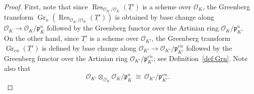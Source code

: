 \documentclass[11pt]{amsart}
\theoremstyle{plain}
\theoremstyle{definition}
\theoremstyle{remark}
\newcommand{\OK}{\mathcal{O}_K}
\newcommand{\pK}{\mathfrak{p}_K}
\DeclareMathOperator{\Gr}{Gr}
\DeclareMathOperator{\Res}{Res}
\newcommand{\iso}{{\ \cong\ }}
\begin{document}
\begin{proof}
First, note that since $\Res_{\mathcal{O}_{K'}/\OK}(\underline{T'})$ 
is a scheme over $\OK$, 
the Greenberg transform $\Gr_{n}\left( \Res_{\mathcal{O}_{K'}/\OK}(\underline{T'})\right)$ 
is obtained by base change along $\OK \to \OK/\pK^n$ 
followed by the Greenberg functor over the Artinian ring $\OK/\pK^n$. 
On the other hand, since $\underline{T'}$ is a scheme over $\mathcal{O}_{K'}$, 
the Greenberg transform $\Gr_{en}(\underline{T'})$ is defined by base change along 
$\mathcal{O}_{K'} \to \mathcal{O}_{K'}/\mathfrak{p}_{K'}^{en}$ 
followed by the Greenberg functor over the Artinian ring $\mathcal{O}_{K'}/\mathfrak{p}_{K'}^{en}$; 
see Definition~\ref{def:Grn}. 
Note also that 
\begin{equation}\label{nem}
\mathcal{O}_{K'} \otimes_{\OK} \OK/\pK^n \iso \mathcal{O}_{K'}/\mathfrak{p}_{K'}^{en}.
\end{equation}


\end{proof}
\end{document}
